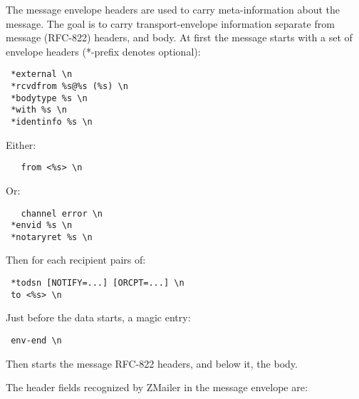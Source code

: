 The message envelope headers are used to carry meta-information
about the message.  The goal is to carry transport-envelope 
information separate from message (RFC-822) headers, and body.
At first the message starts with a set of envelope headers 
(*-prefix denotes optional):

\begin{verbatim}
 *external \n
 *rcvdfrom %s@%s (%s) \n
 *bodytype %s \n
 *with %s \n
 *identinfo %s \n
\end{verbatim}

Either:
\begin{verbatim}
   from <%s> \n
\end{verbatim}

Or:
\begin{verbatim}
   channel error \n
 *envid %s \n
 *notaryret %s \n
\end{verbatim}


Then for each recipient pairs of:
\begin{verbatim}
 *todsn [NOTIFY=...] [ORCPT=...] \n
 to <%s> \n
\end{verbatim}

Just before the data starts, a magic entry:
\begin{verbatim}
 env-end \n
\end{verbatim}


Then starts the message RFC-822 headers, and below it, the body.

The header fields recognized by ZMailer in the message envelope are:

